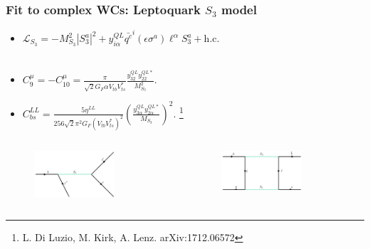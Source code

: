 \documentclass[mathserif, 10pt]{beamer}
\begin{document}
\begin{frame}\frametitle{Fit to complex WCs: Leptoquark $S_3$ model}
    \begin{itemize}
        \item $\mathcal{L}_{S_3} = -M^2_{S_3} |S_3^a|^2 + y_{i\alpha}^{QL} \bar{q^c}^i (\epsilon \sigma^a) \ell^\alpha S_3^a  + \mathrm{h.c.}$~\\~\\
        \item $C_9^\mu = -C_{10}^\mu = \frac{\pi}{\sqrt{2} G_F \alpha V_{tb} V_{ts}^*} \frac{y^{QL}_{32} y^{QL*}_{22}}{M^2_{S_3}}$.
\item $C_{bs}^{LL} = \frac{5\eta^{LL}}{256 \sqrt{2} \pi^2 G_F (V_{tb} V_{ts}^*)^2}\left(\frac{y^{QL}_{3\alpha} y^{QL*}_{2\alpha}}{M_{S_3}}\right)^2$. \footnote[7]{L. Di Luzio, M. Kirk, A. Lenz. arXiv:1712.06572}
    \end{itemize}

    \begin{columns}
        \begin{column}[t]{0.48\textwidth}
            \begin{figure}
                \includegraphics[width=0.7\textwidth]{figures/feynLQLFUV.png}
            \end{figure}
        \end{column}
        \begin{column}[t]{0.48\textwidth}
            \begin{figure}
                \includegraphics[width=0.7\textwidth]{figures/feynLQBs.png}
            \end{figure}
        \end{column}
    \end{columns}
\end{frame}
\end{document}

